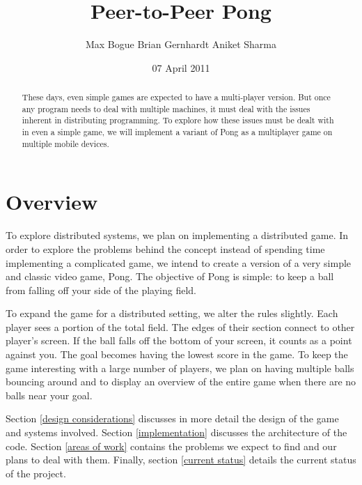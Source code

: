 \documentclass{sig-alternate}
\begin{document}
\title{Peer-to-Peer Pong}
\author{
\alignauthor
Max Bogue
\alignauthor
Brian Gernhardt
\alignauthor
Aniket Sharma
}
\date{07 April 2011}
\maketitle

\begin{abstract}
	These days, even simple games are expected to have a multi-player
	version.  But once any program needs to deal with multiple machines,
	it must deal with the issues inherent in distributing programming.  To
	explore how these issues must be dealt with in even a simple game, we
	will implement a variant of Pong as a multiplayer game on multiple
	mobile devices.
\end{abstract}

\section{Overview}
\label{overview}


To explore distributed systems, we plan on implementing a distributed game.
In order to explore the problems behind the concept instead of spending
time implementing a complicated game, we intend to create a version of a
very simple and classic video game, Pong.  The objective of Pong is simple:
to keep a ball from falling off your side of the playing field.

To expand the game for a distributed setting, we alter the rules slightly.
Each player sees a portion of the total field.  The edges of their section
connect to other player's screen.  If the ball falls off the bottom of your
screen, it counts as a point against you.  The goal becomes having the
lowest score in the game.  To keep the game interesting with a large number
of players, we plan on having multiple balls bouncing around and to display
an overview of the entire game when there are no balls near your goal.

Section \ref{design considerations} discusses in more detail the design of
the game and systems involved.  Section \ref{implementation} discusses the
architecture of the code.  Section \ref{areas of work} contains the
problems we expect to find and our plans to deal with them.  Finally,
section \ref{current status} details the current status of the project.
\end{document}
